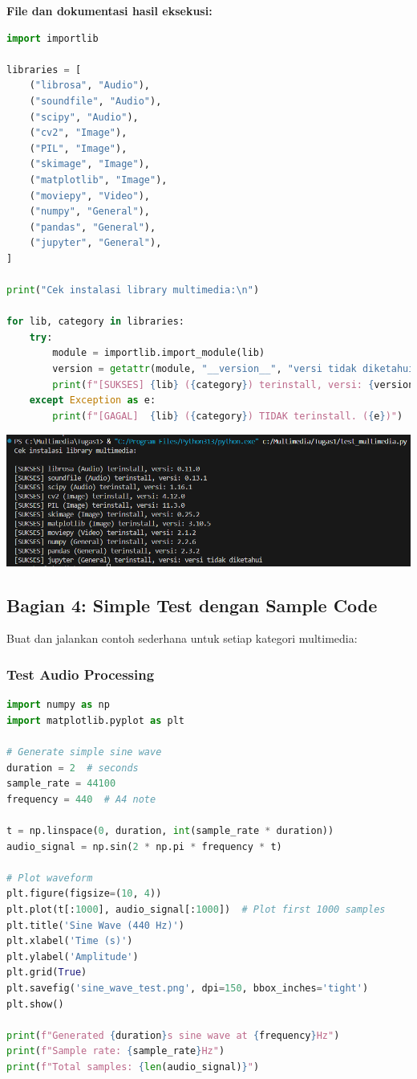 \documentclass[11pt,a4paper]{article}
\begin{document}
\textbf{File dan dokumentasi hasil eksekusi:}
\begin{lstlisting}[language=Python, caption=verifikasi istalasi library multimedia]
import importlib

libraries = [
    ("librosa", "Audio"),
    ("soundfile", "Audio"),
    ("scipy", "Audio"),
    ("cv2", "Image"),
    ("PIL", "Image"),
    ("skimage", "Image"),
    ("matplotlib", "Image"),
    ("moviepy", "Video"),
    ("numpy", "General"),
    ("pandas", "General"),
    ("jupyter", "General"),
]

print("Cek instalasi library multimedia:\n")

for lib, category in libraries:
    try:
        module = importlib.import_module(lib)
        version = getattr(module, "__version__", "versi tidak diketahui")
        print(f"[SUKSES] {lib} ({category}) terinstall, versi: {version}")
    except Exception as e:
        print(f"[GAGAL]  {lib} ({category}) TIDAK terinstall. ({e})")
\end{lstlisting}
\begin{center}
	\includegraphics[scale = 0.5]{Figure/Screenshot 2025-08-28 204417.png}
	\vspace{0.1cm}
\end{center}

\subsection{Bagian 4: Simple Test dengan Sample Code}
Buat dan jalankan contoh sederhana untuk setiap kategori multimedia:

\subsubsection{Test Audio Processing}
\begin{lstlisting}[language=Python, caption=Test audio processing sederhana]
import numpy as np
import matplotlib.pyplot as plt

# Generate simple sine wave
duration = 2  # seconds
sample_rate = 44100
frequency = 440  # A4 note

t = np.linspace(0, duration, int(sample_rate * duration))
audio_signal = np.sin(2 * np.pi * frequency * t)

# Plot waveform
plt.figure(figsize=(10, 4))
plt.plot(t[:1000], audio_signal[:1000])  # Plot first 1000 samples
plt.title('Sine Wave (440 Hz)')
plt.xlabel('Time (s)')
plt.ylabel('Amplitude')
plt.grid(True)
plt.savefig('sine_wave_test.png', dpi=150, bbox_inches='tight')
plt.show()

print(f"Generated {duration}s sine wave at {frequency}Hz")
print(f"Sample rate: {sample_rate}Hz")
print(f"Total samples: {len(audio_signal)}")
\end{lstlisting}
\end{document}
